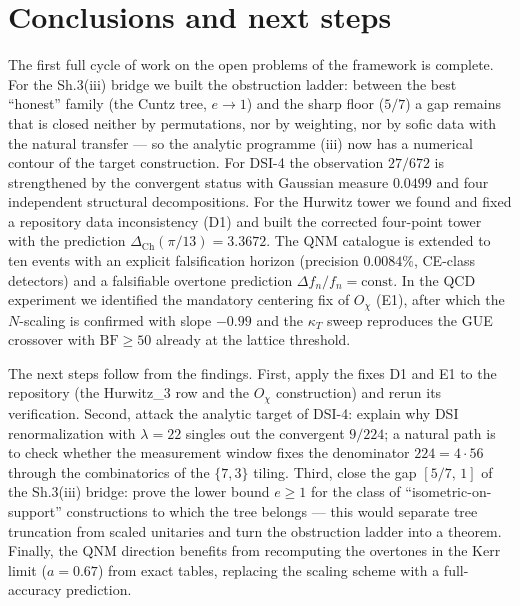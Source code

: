 \documentclass[11pt,a4paper]{article}
\begin{document}
\section{Conclusions and next steps}\label{sec:concl}

The first full cycle of work on the open problems of the framework is
complete. For the Sh.3(iii) bridge we built the obstruction ladder: between
the best ``honest'' family (the Cuntz tree, $e \to 1$) and the sharp floor
($5/7$) a gap remains that is closed neither by permutations, nor by
weighting, nor by sofic data with the natural transfer --- so the analytic
programme (iii) now has a numerical contour of the target construction. For
DSI-4 the observation $27/672$ is strengthened by the convergent status with
Gaussian measure $0.0499$ and four independent structural decompositions. For
the Hurwitz tower we found and fixed a repository data inconsistency (D1) and
built the corrected four-point tower with the prediction
$\Delta_{\mathrm{Ch}}(\pi/13) = 3.3672$. The QNM catalogue is extended to ten
events with an explicit falsification horizon (precision $0.0084\%$,
CE-class detectors) and a falsifiable overtone prediction
$\Delta f_n/f_n = \mathrm{const}$. In the QCD experiment we identified the
mandatory centering fix of $O_\chi$ (E1), after which the $N$-scaling is
confirmed with slope $-0.99$ and the $\kappa_T$ sweep reproduces the GUE
crossover with $\mathrm{BF} \ge 50$ already at the lattice threshold.

The next steps follow from the findings. First, apply the fixes D1 and E1 to
the repository (the Hurwitz\_3 row and the $O_\chi$ construction) and rerun
its verification. Second, attack the analytic target of DSI-4: explain why
DSI renormalization with $\lambda = 22$ singles out the convergent $9/224$;
a natural path is to check whether the measurement window fixes the
denominator $224 = 4\cdot 56$ through the combinatorics of the $\{7,3\}$
tiling. Third, close the gap $[5/7,\,1]$ of the Sh.3(iii) bridge: prove the
lower bound $e \ge 1$ for the class of ``isometric-on-support'' constructions
to which the tree belongs --- this would separate tree truncation from scaled
unitaries and turn the obstruction ladder into a theorem. Finally, the QNM
direction benefits from recomputing the overtones in the Kerr limit
($a = 0.67$) from exact tables, replacing the scaling scheme with a
full-accuracy prediction.
\end{document}
